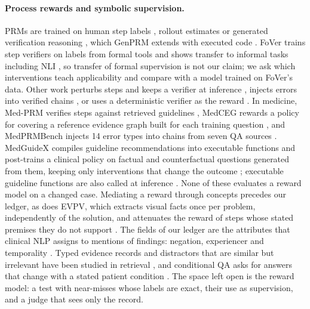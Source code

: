 \documentclass[11pt]{article}
\begin{document}
\paragraph{Process rewards and symbolic supervision.}
PRMs are trained on human step labels \citep{lightman2024verify}, rollout
estimates \citep{wang2024mathshepherd} or generated verification reasoning
\citep{khalifa2025thinkprm}, which GenPRM extends with executed code
\citep{zhao2025genprm}. FoVer trains step verifiers on
labels from formal tools and shows transfer to informal tasks including NLI
\citep{kamoi2026fover}, so transfer of formal supervision is not our claim;
we ask which interventions teach applicability and compare with a model
trained on FoVer's data. Other work perturbs steps and keeps a verifier at
inference \citep{zi2026nsprm}, injects errors into verified chains
\citep{chi2026vcs}, or uses a deterministic verifier as the reward
\citep{pronesti2026vprm}. In medicine, Med-PRM verifies steps against
retrieved guidelines \citep{yun2025medprm}, MedCEG rewards a policy for covering
a reference evidence graph built for each training question
\citep{medceg2025}, and MedPRMBench injects 14 error types into
chains from seven QA sources \citep{wu2026medprmbench}. MedGuideX compiles
guideline recommendations into executable functions and post-trains a clinical
policy on factual and counterfactual questions generated from them, keeping
only interventions that change the outcome \citep{shen2026medguidex};
executable guideline functions are also called at inference
\citep{cao2026guideskill}. None of these evaluates a
reward model on a changed case. Mediating a reward through
concepts \citep{koh2020cbm,laguna2025cbrm} precedes our ledger, as does EVPV,
which extracts visual facts once per problem, independently of the solution,
and attenuates the reward of steps whose stated premises they do not support
\citep{evpv2026}. The fields of our ledger are the attributes that clinical
NLP assigns to mentions of findings: negation, experiencer and temporality
\citep{chapman2001negex,harkema2009context,uzuner2011i2b2}. Typed evidence
records and distractors that are similar but irrelevant have been studied in
retrieval \citep{zhou2026fincards,agand2026venra,chen2026deepera}, and
conditional QA asks for answers that change with a stated patient condition
\citep{parekh2026cgr}. The space left open is the reward model: a test with
near-misses whose labels are exact, their use as supervision, and a judge that
sees only the record.
\end{document}
